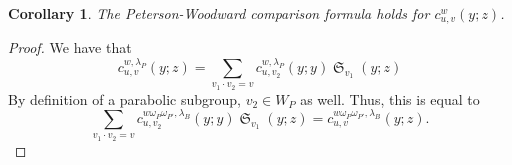 \documentclass{amsart}
\newtheorem{corollary}[lemma]{Corollary}
\theoremstyle{definition}
\theoremstyle{remark}
\numberwithin{equation}{section}
\DeclareMathOperator{\sch}{\mathfrak{S}}
\begin{document}
\begin{corollary}
The Peterson-Woodward comparison formula holds for $c_{u,v}^w(y;z)$.
\end{corollary}
\begin{proof}
We have that
$$c_{u,v}^{w,\lambda_P}(y;z) = \sum_{v_1\cdot v_2=v}c_{u,v_2}^{w,\lambda_P}(y;y)\sch_{v_1}(y;z)$$
By definition of a parabolic subgroup, $v_2\in W_P$ as well. Thus, this is equal to
$$\sum_{v_1\cdot v_2=v}c_{u,v_2}^{w\omega_P\omega_{P'},\lambda_B}(y;y)\sch_{v_1}(y;z) = c_{u,v}^{w\omega_P\omega_{P'},\lambda_B}(y;z).$$
\end{proof}




\end{document}

